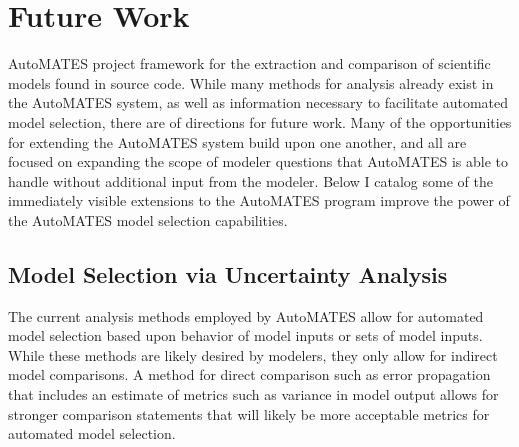 \section{Future Work\label{sec:future_work}}
 AutoMATES project 
framework for the extraction and comparison of scientific models found in source code.
While many methods for analysis already exist in the AutoMATES system, as well as information necessary to facilitate automated model selection, there are  %
of directions for future work.
Many of the opportunities for extending the AutoMATES system build upon one another, and all are focused on expanding the scope of modeler questions that AutoMATES is able to handle without additional input from the modeler.
Below I catalog some of the immediately visible extensions to the AutoMATES program improve the power of the AutoMATES model selection capabilities.

%

\subsection{Model Selection via Uncertainty Analysis \label{auto_uncert_analysis}}
The current analysis methods employed by AutoMATES allow for automated model selection based upon behavior of model inputs or sets of model inputs. While these methods are likely desired by modelers, they only allow for indirect model comparisons. A method for direct comparison such as error propagation that includes an estimate of metrics such as variance in model output allows for stronger comparison statements that will likely be more acceptable metrics for automated model selection.

